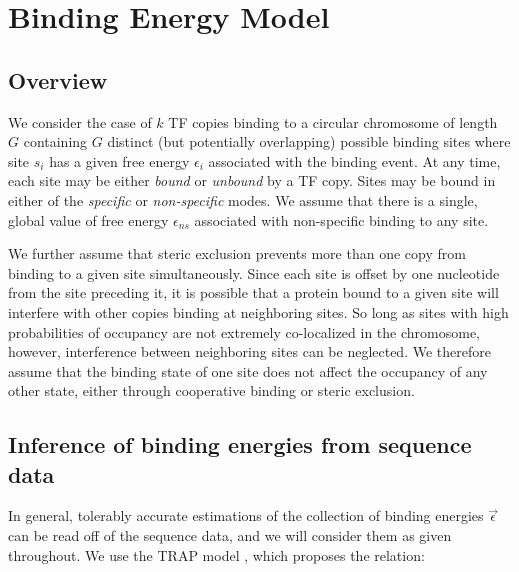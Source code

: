 \documentclass{article}
\begin{document}

\section{Binding Energy Model}
\subsection{Overview}
We consider the case of $k$ TF copies binding to a circular chromosome
of length $G$ containing $G$ distinct (but potentially overlapping)
possible binding sites where site $s_i$ has a given free energy
$\epsilon_i $ associated with the binding event.  At any time, each
site may be either \textit{bound} or \textit{unbound} by a TF copy.
Sites may be bound in either of the \textit{specific} or
\textit{non-specific} modes.  We assume that there is a single, global
value of free energy $\epsilon_{ns}$ associated with non-specific
binding to any site.


We further assume that steric exclusion prevents more than one copy
from binding to a given site simultaneously.  Since each site is
offset by one nucleotide from the site preceding it, it is possible
that a protein bound to a given site will interfere with other copies
binding at neighboring sites.  So long as sites with high
probabilities of occupancy are not extremely co-localized in the
chromosome, however, interference between neighboring sites can be
neglected.  We therefore assume that the binding state of one site
does not affect the occupancy of any other state, either through
cooperative binding or steric exclusion.


\subsection{Inference of binding energies from sequence data}
In general, tolerably accurate estimations of the collection of
binding energies $\vec{\epsilon}$ can be read off of the sequence
data, and we will consider them as given throughout.  We use the TRAP
model \cite{roider07}, which proposes the relation:
\end{document}

